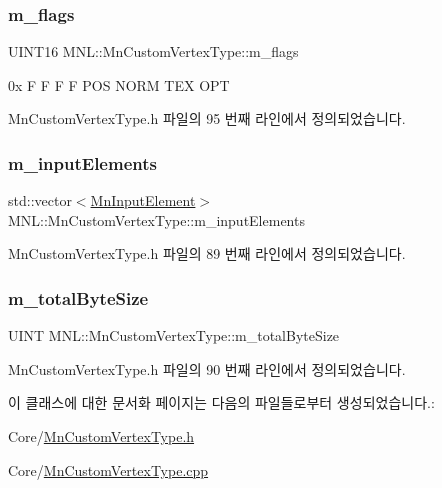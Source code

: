 \subsubsection{\texorpdfstring{m\+\_\+flags}{m\_flags}}
{\footnotesize\ttfamily U\+I\+N\+T16 M\+N\+L\+::\+Mn\+Custom\+Vertex\+Type\+::m\+\_\+flags\hspace{0.3cm}{\ttfamily [private]}}

0x F F F F P\+OS N\+O\+RM T\+EX O\+PT 

Mn\+Custom\+Vertex\+Type.\+h 파일의 95 번째 라인에서 정의되었습니다.

\mbox{\label{class_m_n_l_1_1_mn_custom_vertex_type_a965c3249b7bce95b3ef1cb5ce8c9e74e}} 
\subsubsection{\texorpdfstring{m\+\_\+input\+Elements}{m\_inputElements}}
{\footnotesize\ttfamily std\+::vector$<$\hyperlink{class_m_n_l_1_1_mn_input_element}{Mn\+Input\+Element}$>$ M\+N\+L\+::\+Mn\+Custom\+Vertex\+Type\+::m\+\_\+input\+Elements\hspace{0.3cm}{\ttfamily [private]}}



Mn\+Custom\+Vertex\+Type.\+h 파일의 89 번째 라인에서 정의되었습니다.

\mbox{\label{class_m_n_l_1_1_mn_custom_vertex_type_a07e3efae7a30c0c74665abf18426e336}} 
\subsubsection{\texorpdfstring{m\+\_\+total\+Byte\+Size}{m\_totalByteSize}}
{\footnotesize\ttfamily U\+I\+NT M\+N\+L\+::\+Mn\+Custom\+Vertex\+Type\+::m\+\_\+total\+Byte\+Size\hspace{0.3cm}{\ttfamily [private]}}



Mn\+Custom\+Vertex\+Type.\+h 파일의 90 번째 라인에서 정의되었습니다.



이 클래스에 대한 문서화 페이지는 다음의 파일들로부터 생성되었습니다.\+:\begin{DoxyCompactItemize}
\item 
Core/\hyperlink{_mn_custom_vertex_type_8h}{Mn\+Custom\+Vertex\+Type.\+h}\item 
Core/\hyperlink{_mn_custom_vertex_type_8cpp}{Mn\+Custom\+Vertex\+Type.\+cpp}\end{DoxyCompactItemize}
